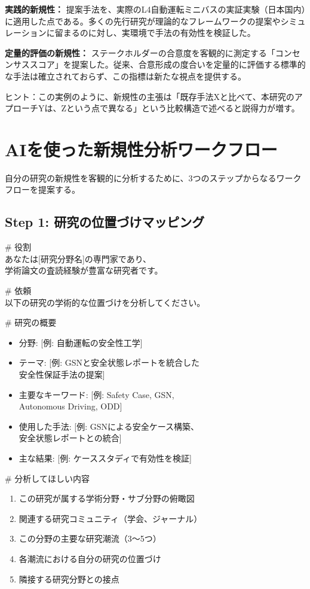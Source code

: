 \textbf{実践的新規性：}
提案手法を、実際のL4自動運転ミニバスの実証実験（日本国内）に適用した点である。多くの先行研究が理論的なフレームワークの提案やシミュレーションに留まるのに対し、実環境で手法の有効性を検証した。

\textbf{定量的評価の新規性：}
ステークホルダーの合意度を客観的に測定する「コンセンサススコア」を提案した。従来、合意形成の度合いを定量的に評価する標準的な手法は確立されておらず、この指標は新たな視点を提供する。

\begin{screen}
ヒント：この実例のように、新規性の主張は「既存手法Xと比べて、本研究のアプローチYは、Zという点で異なる」という比較構造で述べると説得力が増す。
\end{screen}

\section{AIを使った新規性分析ワークフロー}

自分の研究の新規性を客観的に分析するために、3つのステップからなるワークフローを提案する。

\subsection{Step 1: 研究の位置づけマッピング}

\begin{promptbox}
\# 役割\\
あなたは[研究分野名]の専門家であり、\\
学術論文の査読経験が豊富な研究者です。

\# 依頼\\
以下の研究の学術的な位置づけを分析してください。

\# 研究の概要
\begin{itemize}
\item 分野: [例: 自動運転の安全性工学]
\item テーマ: [例: GSNと安全状態レポートを統合した\\
安全性保証手法の提案]
\item 主要なキーワード: [例: Safety Case, GSN,\\
Autonomous Driving, ODD]
\item 使用した手法: [例: GSNによる安全ケース構築、\\
安全状態レポートとの統合]
\item 主な結果: [例: ケーススタディで有効性を検証]
\end{itemize}

\# 分析してほしい内容
\begin{enumerate}
\item この研究が属する学術分野・サブ分野の俯瞰図
\item 関連する研究コミュニティ（学会、ジャーナル）
\item この分野の主要な研究潮流（3〜5つ）
\item 各潮流における自分の研究の位置づけ
\item 隣接する研究分野との接点
\end{enumerate}
\end{promptbox}

